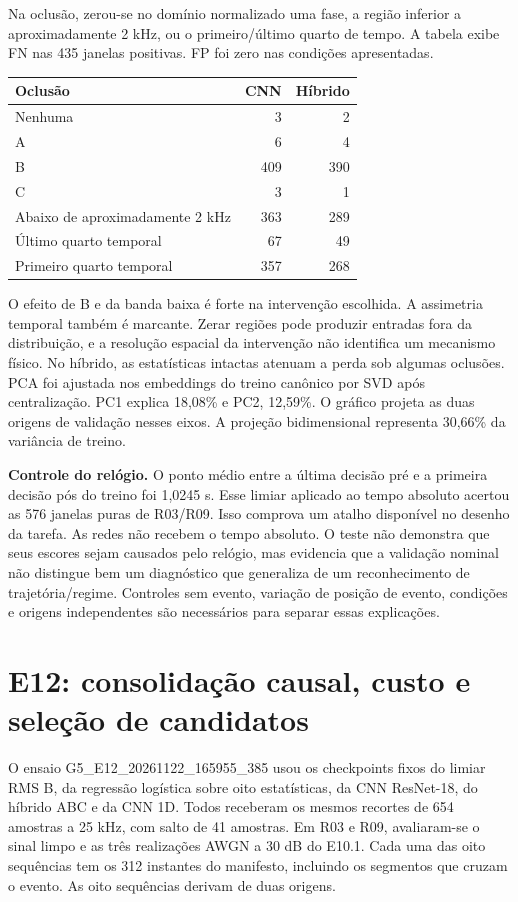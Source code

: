 \documentclass[11pt,a4paper]{article}
\begin{document}
Na oclusão, zerou-se no domínio normalizado uma fase, a região inferior a aproximadamente 2 kHz, ou o primeiro/último quarto de tempo. A tabela exibe FN nas 435 janelas positivas. FP foi zero nas condições apresentadas.
\begin{center}
\begin{tabular}{@{}lrr@{}}\toprule
Oclusão & CNN & Híbrido\\\midrule
Nenhuma & 3 & 2\\
A & 6 & 4\\
B & 409 & 390\\
C & 3 & 1\\
Abaixo de aproximadamente 2 kHz & 363 & 289\\
Último quarto temporal & 67 & 49\\
Primeiro quarto temporal & 357 & 268\\\bottomrule
\end{tabular}
\end{center}
O efeito de B e da banda baixa é forte na intervenção escolhida. A assimetria temporal também é marcante. Zerar regiões pode produzir entradas fora da distribuição, e a resolução espacial da intervenção não identifica um mecanismo físico. No híbrido, as estatísticas intactas atenuam a perda sob algumas oclusões. PCA foi ajustada nos embeddings do treino canônico por SVD após centralização. PC1 explica 18,08\% e PC2, 12,59\%. O gráfico projeta as duas origens de validação nesses eixos. A projeção bidimensional representa 30,66\% da variância de treino.

\textbf{Controle do relógio.} O ponto médio entre a última decisão pré e a primeira decisão pós do treino foi 1,0245 s. Esse limiar aplicado ao tempo absoluto acertou as 576 janelas puras de R03/R09. Isso comprova um atalho disponível no desenho da tarefa. As redes não recebem o tempo absoluto. O teste não demonstra que seus escores sejam causados pelo relógio, mas evidencia que a validação nominal não distingue bem um diagnóstico que generaliza de um reconhecimento de trajetória/regime. Controles sem evento, variação de posição de evento, condições e origens independentes são necessários para separar essas explicações.

\section{E12: consolidação causal, custo e seleção de candidatos}
O ensaio G5\_E12\_20261122\_165955\_385 usou os checkpoints fixos do limiar RMS B, da regressão logística sobre oito estatísticas, da CNN ResNet-18, do híbrido ABC e da CNN 1D. Todos receberam os mesmos recortes de 654 amostras a 25 kHz, com salto de 41 amostras. Em R03 e R09, avaliaram-se o sinal limpo e as três realizações AWGN a 30 dB do E10.1. Cada uma das oito sequências tem os 312 instantes do manifesto, incluindo os segmentos que cruzam o evento. As oito sequências derivam de duas origens.
\end{document}
